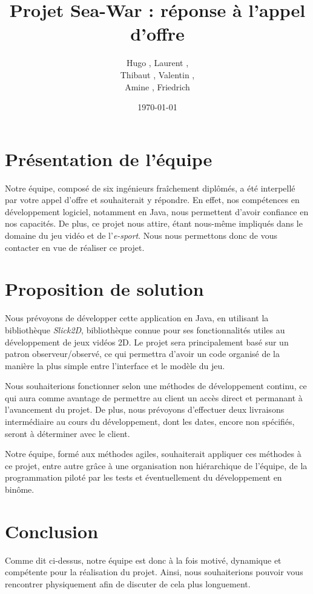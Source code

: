 \documentclass{article}
\title{Projet Sea-War : réponse à l'appel d'offre}
\author{Hugo \bsc{Ayats}, Laurent \bsc{Pichollet},\\ Thibaut \bsc{Lausecker}, Valentin \bsc{Louveau},\\ Amine \bsc{Abdellaoui}, Friedrich \bsc{Gonda}}
\date{\today}
\begin{document}
\maketitle

\section*{Présentation de l'équipe}

Notre équipe, composé de six ingénieurs fraîchement diplômés, a été interpellé par votre appel d'offre et souhaiterait y répondre. En effet, nos compétences en développement logiciel, notamment en Java, nous permettent d'avoir confiance en nos capacités. De plus, ce projet nous attire, étant nous-même impliqués dans le domaine du jeu vidéo et de l'\textit{e-sport}. Nous nous permettons donc de vous contacter en vue de réaliser ce projet.



\section*{Proposition de solution}

Nous prévoyons de développer cette application en Java, en utilisant la bibliothèque \textit{Slick2D}, bibliothèque connue pour ses fonctionnalités utiles au développement de jeux vidéos 2D. Le projet sera principalement basé sur un patron observeur/observé, ce qui permettra d'avoir un code organisé de la manière la plus simple entre l'interface et le modèle du jeu. 

Nous souhaiterions fonctionner selon une méthodes de développement continu, ce qui aura comme avantage de permettre au client un accès direct et permanant à l'avancement du projet. De plus, nous prévoyons d'effectuer deux livraisons intermédiaire au cours du développement, dont les dates, encore non spécifiés, seront à déterminer avec le client.

Notre équipe, formé aux méthodes agiles, souhaiterait appliquer ces méthodes à ce projet, entre autre grâce à une organisation non hiérarchique de l'équipe, de la programmation piloté par les tests et éventuellement du développement en binôme.

\section*{Conclusion}

Comme dit ci-dessus, notre équipe est donc à la fois motivé, dynamique et compétente pour la réalisation du projet. Ainsi, nous souhaiterions pouvoir vous rencontrer physiquement afin de discuter de cela plus longuement.
\end{document}
